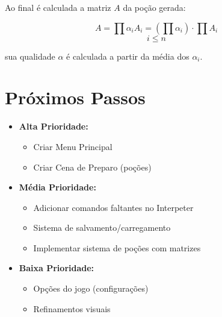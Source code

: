 \documentclass[12pt]{article}
\begin{document}
Ao final é calculada a matriz \(A\) da poção gerada:

\[A = \prod{\alpha_i A_i} = (\prod{\alpha_i}) \cdot \prod{A_i} \]
\[i \leq n \]

sua qualidade \(\alpha\) é calculada a partir da média dos \(\alpha_i\).

\newpage

\section{Próximos Passos}

\begin{itemize}
    \item \textbf{Alta Prioridade:}
    \begin{itemize}
        \item Criar Menu Principal
        \item Criar Cena de Preparo (poções)
    \end{itemize}
    
    \item \textbf{Média Prioridade:}
    \begin{itemize}
        \item Adicionar comandos faltantes no Interpeter
        \item Sistema de salvamento/carregamento
        \item Implementar sistema de poções com matrizes
    \end{itemize}
    
    \item \textbf{Baixa Prioridade:}
    \begin{itemize}
        \item Opções do jogo (configurações)
        \item Refinamentos visuais
    \end{itemize}
\end{itemize}
\end{document}
